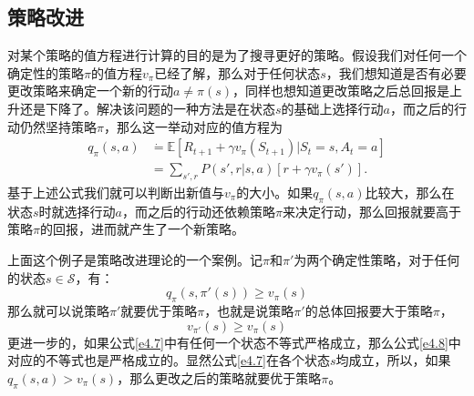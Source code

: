 \documentclass{ctexart}
\begin{document}
        \subsection{策略改进}
            对某个策略的值方程进行计算的目的是为了搜寻更好的策略。假设我们对任何一个确定性的策略$\pi$的值方程$v_{\pi}$已经了解，那么对于任何状态$s$，我们想知道是否有必要更改策略来确定一个新的行动$a\ne \pi(s)$，同样也想知道更改策略之后总回报是上升还是下降了。解决该问题的一种方法是在状态$s$的基础上选择行动$a$，而之后的行动仍然坚持策略$\pi$，那么这一举动对应的值方程为
            \begin{equation}
                \begin{split}
                    q_{\pi}(s,a) &\dot{=} \mathbb{E}[R_{t+1} + \gamma v_{\pi}(S_{t+1})| S_t = s,A_t = a] \\
                    &= \sum_{s',r} P(s',r|s,a) [r + \gamma v_{\pi}(s')].
                \end{split}
                \label{e4.6}
            \end{equation}
            基于上述公式我们就可以判断出新值与$v_{\pi}$的大小。如果$q_{\pi}(s,a)$比较大，那么在状态$s$时就选择行动$a$，而之后的行动还依赖策略$\pi$来决定行动，那么回报就要高于策略$\pi$的回报，进而就产生了一个新策略。

            上面这个例子是策略改进理论的一个案例。记$\pi$和$\pi '$为两个确定性策略，对于任何的状态$s \in \mathcal{S}$，有：
            \begin{equation}
                q_{\pi} (s,\pi '(s)) \ge v_{\pi}(s)
                \label{e4.7}
            \end{equation}
            那么就可以说策略$\pi '$就要优于策略$\pi$，也就是说策略$\pi '$的总体回报要大于策略$\pi$，
            \begin{equation}
                v_{\pi '}(s) \ge v_{\pi}(s)
                \label{e4.8}
            \end{equation}
            更进一步的，如果公式\ref{e4.7}中有任何一个状态不等式严格成立，那么公式\ref{e4.8}中对应的不等式也是严格成立的。显然公式\ref{e4.7}在各个状态$s$均成立，所以，如果$q_{\pi}(s,a) > v_{\pi}(s)$，那么更改之后的策略就要优于策略$\pi$。
\end{document}
